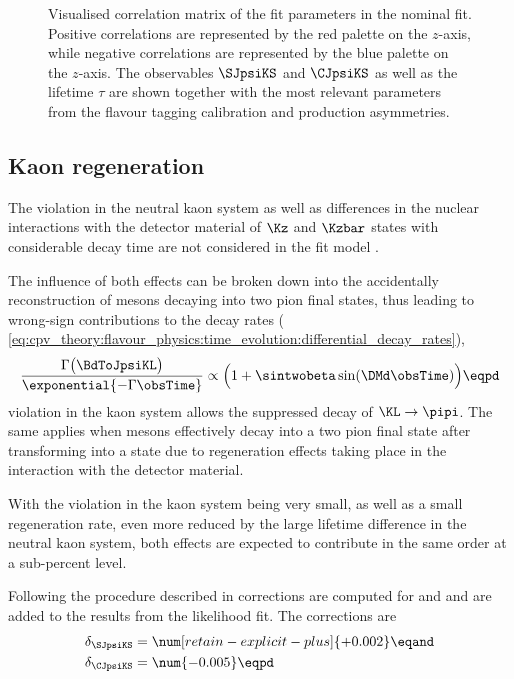 %
\begin{figure}
\centering
  
  \caption{Visualised correlation matrix of the fit parameters in
    the nominal fit. Positive correlations are represented by the red palette on
    the $z$-axis, while negative correlations are represented by the blue
    palette on the $z$-axis. The \CP observables $\SJpsiKS$ and $\CJpsiKS$ as
    well as the \Bd lifetime $\tau$ are shown together with the most relevant
    parameters from the flavour tagging calibration and production asymmetries.}
  \label{fig:measurement_of_sin2beta:cpv_measurement:results:plots:correlation_matrix}
\end{figure}

\FloatBarrier
\subsection{Kaon regeneration}
\label{sec:measurement_of_sin2beta:cpv_measurement:kaon_regeneration}

The \CP violation in the neutral kaon system as well as differences in the
nuclear interactions with the detector material of $\Kz$ and $\Kzbar$ states
with considerable decay time are not considered in the fit model
\cite{set:kaonregeneration}.

The influence of both effects can be broken down into the accidentally
reconstruction of \KL mesons decaying into two pion final states, thus
leading to wrong-sign contributions to the decay rates (\cf
\cref{eq:cpv_theory:flavour_physics:time_evolution:differential_decay_rates}),
%
\begin{equation}
    \frac{\Gamma \bigl(\BdToJpsiKL\bigr)}{\exponential{-\Gamma \obsTime}} \propto \Bigl( 1 + \sintwobeta \sin(\DMd \obsTime) \Bigr) \eqpd
\end{equation}
%
\CP violation in the kaon system allows the suppressed decay of $\KL\to\pipi$.
The same applies when \KL mesons effectively decay into a two pion final state
after transforming into a \KS state due to regeneration effects taking place in
the interaction with the detector material. 

With the \CP violation in the kaon system being very small, as well as a small
regeneration rate, even more reduced by the large lifetime difference in the
neutral kaon system, both effects are expected to contribute in the same order
at a sub-percent level.

Following the procedure described in \cite{Aaij:2014gsa} corrections are
computed for \SJpsiKS and \CJpsiKS and are added to the results from the
likelihood fit. The corrections are
%
\begin{equation}
  \begin{split}
    \delta_{\SJpsiKS} &= \num[retain-explicit-plus]{+0.002} \eqand\\
    \delta_{\CJpsiKS} &= \num{-0.005} \eqpd
  \end{split}
\end{equation}
